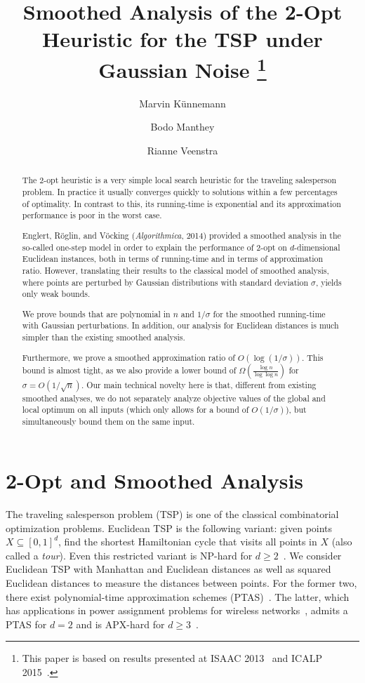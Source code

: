 \documentclass[11pt,DIV=12,a4paper]{scrartcl}
\title{Smoothed Analysis of the 2-Opt Heuristic for the TSP under Gaussian Noise \thanks{This paper is based on results
presented at ISAAC 2013~\cite{MantheyVeenstra:2Opt:2013} and ICALP 2015~\cite{KuennemannManthey:2Opt:2015}.}}
\author[1]{Marvin K\"unnemann}
\author[2]{Bodo Manthey}
\author[2]{Rianne Veenstra}
\affil[1]{Max Planck Institute for Informatics, Saarbr\"ucken, Germany, and Saarbr\"ucken Graduate School of Computer Science, \texttt{marvin@mpi-inf.mpg.de}}
\affil[2]{University of Twente, Department of Applied Mathematics, Enschede, Netherlands, \texttt{b.manthey@utwente.nl}}
\newcommand{\todo}[1]{\fbox{\bfseries\boldmath TODO: #1}}
\begin{document}
\maketitle

\thispagestyle{plain}
\begin{abstract}
The 2-opt heuristic is a very simple local search heuristic for the
traveling salesperson problem. In practice it usually converges quickly
to solutions within a few percentages of optimality. In contrast to this, its running-time
is exponential and its approximation performance is poor in the worst case.

Englert, R\"oglin, and V\"ocking (\emph{Algorithmica}, 2014)
provided a smoothed analysis in the so-called
one-step model in order to explain the performance of 2-opt on $d$-dimensional
Euclidean instances, both in terms of running-time and in terms of approximation ratio. However, translating their results to the classical
model of smoothed analysis, where points are perturbed by Gaussian distributions with standard deviation $\sigma$, yields only
weak bounds.

We prove bounds that are polynomial in $n$ and $1/\sigma$
for the smoothed running-time with Gaussian perturbations.
In addition, our analysis for Euclidean distances is much simpler than
the existing smoothed analysis.

Furthermore, we prove a smoothed approximation ratio of $O(\log (1/\sigma))$. This bound is almost tight,
as we also provide a lower bound of $\Omega(\frac{\log n}{\log\log n})$ for $\sigma = O(1/\sqrt n)$.
Our main technical novelty here is that, different from existing smoothed analyses, we do not separately analyze objective values of the global and local 
optimum on all inputs (which only allows for a bound of $O(1/\sigma)$), but simultaneously bound them on the same input.
\end{abstract}

%

\section{2-Opt and Smoothed Analysis}
\label{sec:intro}

The traveling salesperson problem (TSP) is one of the classical combinatorial optimization problems.
Euclidean TSP is the following variant: given points $X \subseteq [0,1]^d$, find the shortest Hamiltonian
cycle that visits all points in $X$ (also called a \emph{tour}). Even this restricted variant is NP-hard for $d \geq 2$~\cite{Papadimitriou:EuclideanTSP:1977}.
We consider Euclidean TSP with Manhattan and Euclidean distances as well as squared
Euclidean distances to measure the distances between points.
For the former two, there exist polynomial-time approximation schemes (PTAS)~\cite{Arora:PTASEuclideanTSP:1998,Mitchell:EuclideanPTAS:1999}. The latter,
which has applications in power assignment problems for wireless networks~\cite{FunkeEA:PowerTSP:2011}, admits a
PTAS for $d=2$ and is APX-hard for $d \geq 3$~\cite{NijnattenEA:TSPSquared:2010}.
\end{document}

